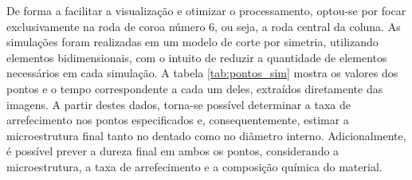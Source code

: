 \par
De forma a facilitar a visualização e otimizar o processamento, optou-se por focar exclusivamente na roda de coroa número 6, ou seja, a roda central da coluna. As simulações foram realizadas em um modelo de corte por simetria, utilizando elementos bidimensionais, com o intuito de reduzir a quantidade de elementos necessários em cada simulação. A tabela \ref{tab:pontos_sim} mostra os valores dos pontos e o tempo correspondente a cada um deles, extraídos diretamente das imagens. A partir destes dados, torna-se possível determinar a taxa de arrefecimento nos pontos especificados e, consequentemente, estimar a microestrutura final tanto no dentado como no diâmetro interno. Adicionalmente, é possível prever a dureza final em ambos os pontos, considerando a microestrutura, a taxa de arrefecimento e a composição química do material.
\newpage
